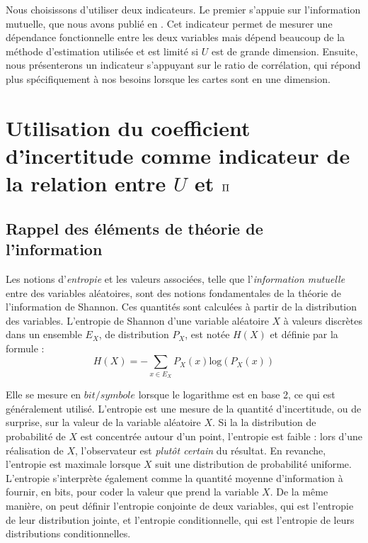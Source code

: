 \documentclass[../main]{subfiles}
\begin{document}
Nous choisissons d'utiliser deux indicateurs. 
Le premier s'appuie sur l'information mutuelle, que nous avons publié en \cite{Gonnier2020ConsensusDS}. Cet indicateur permet de mesurer une dépendance fonctionnelle entre les deux variables mais dépend beaucoup de la méthode d'estimation utilisée et est limité si $U$ est de grande dimension.
Ensuite, nous présenterons un indicateur s'appuyant sur le ratio de corrélation, qui répond plus spécifiquement à nos besoins lorsque les cartes sont en une dimension. 

\section{Utilisation du coefficient d'incertitude comme indicateur de la relation entre $U$ et $\Pi$}

\subsection{Rappel des éléments de théorie de l'information}
Les notions d'\emph{entropie} et les valeurs associées, telle que l'\emph{information mutuelle} entre des variables aléatoires, sont des notions fondamentales de la théorie de l'information de Shannon. Ces quantités sont calculées à partir de la distribution des variables.
L'entropie de Shannon d'une variable aléatoire $X$ à valeurs discrètes dans un ensemble $E_X$, de distribution $P_X$, est notée $H(X)$ et définie par la formule : 
\begin{equation}
H(X) = - \sum_{x \in E_X}{P_X(x)\textrm{log}(P_X(x))}
\end{equation}

Elle se mesure en $bit/symbole$ lorsque le logarithme est en base 2, ce qui est généralement utilisé. 
L'entropie est une mesure de la quantité d'incertitude, ou de surprise, sur la valeur de la variable aléatoire $X$. Si la la distribution de probabilité de $X$ est concentrée autour d'un point, l'entropie est faible : lors d'une réalisation de $X$, l'observateur est \emph{plutôt certain} du résultat. En revanche, l'entropie est maximale lorsque $X$ suit une distribution de probabilité uniforme.
L'entropie s'interprète également comme la quantité moyenne d'information à fournir, en bits, pour coder la valeur que prend la variable $X$.
De la même manière, on peut définir l'entropie conjointe de deux variables, qui est l'entropie de leur distribution jointe, et l'entropie conditionnelle, qui est l'entropie de leurs distributions conditionnelles.
\end{document}
